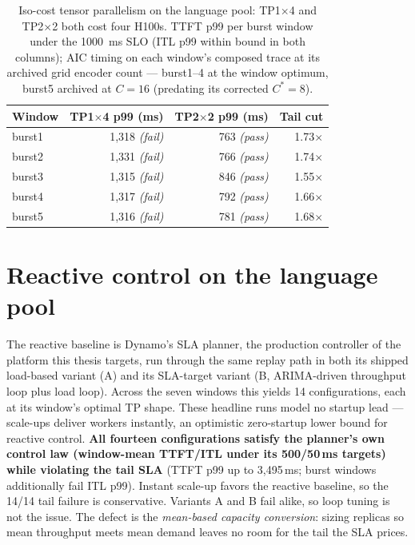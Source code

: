 \begin{table}[htbp]
\centering
\caption{Iso-cost tensor parallelism on the language pool: TP1$\times$4
and TP2$\times$2 both cost four H100s. TTFT p99 per burst window under the
\SI{1000}{\milli\second} SLO (ITL p99 within bound in both columns); AIC
timing on each window's composed trace at its archived grid encoder
count --- burst1--4 at the window optimum, burst5 archived at $C{=}16$
(predating its corrected $C^{*}{=}8$).}
\label{tab:base-tp}
\small
\begin{tabular}{@{}lrrr@{}}
\toprule
Window & TP1$\times$4 p99 (ms) & TP2$\times$2 p99 (ms) & Tail cut \\
\midrule
burst1 & 1{,}318 \emph{(fail)} & 763 \emph{(pass)} & 1.73$\times$ \\
burst2 & 1{,}331 \emph{(fail)} & 766 \emph{(pass)} & 1.74$\times$ \\
burst3 & 1{,}315 \emph{(fail)} & 846 \emph{(pass)} & 1.55$\times$ \\
burst4 & 1{,}317 \emph{(fail)} & 792 \emph{(pass)} & 1.66$\times$ \\
burst5 & 1{,}316 \emph{(fail)} & 781 \emph{(pass)} & 1.68$\times$ \\
\bottomrule
\end{tabular}
\end{table}

\section{Reactive control on the language pool}
\label{sec:base-reactive-llm}

The reactive baseline is Dynamo's SLA planner, the production controller
of the platform this thesis targets, run through the same replay path in
both its shipped load-based variant (A) and its SLA-target variant (B,
ARIMA-driven throughput loop plus load loop). Across the seven windows
this yields 14 configurations, each at its window's optimal TP shape.
These headline runs model no startup lead --- scale-ups deliver workers
instantly, an optimistic zero-startup lower bound for reactive control.
\textbf{All fourteen configurations satisfy the planner's own control
law (window-mean TTFT/ITL under its 500/50\,ms targets) while violating
the tail SLA} (TTFT p99 up to 3{,}495\,\si{\milli\second}; burst windows
additionally fail ITL p99). Instant scale-up favors the reactive
baseline, so the 14/14 tail failure is conservative. Variants A and B
fail alike, so loop tuning is not the issue. The defect is the \emph{mean-based capacity
conversion}: sizing replicas so mean throughput meets mean demand leaves
no room for the tail the SLA prices.

